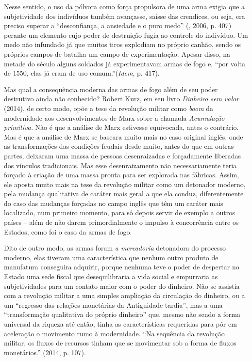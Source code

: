 Nesse sentido, o uso da pólvora como força propulsora de uma arma exigia
que a subjetividade dos indivíduos também avançasse, saísse das
crendices, ou seja, era preciso superar a ``desconfiança, a ansiedade e
o puro medo'' (, 2006, p. 407) perante um elemento cujo poder de
destruição fugia ao controle do indivíduo. Um medo não infundado já que
muitos tiros explodiam no próprio canhão, sendo os próprios campos de
batalha um campo de experimentação. Apesar disso, na metade do século 
alguns soldados já experimentavam armas de fogo e, ``por volta de 1550,
elas já eram de uso comum.''(\emph{Idem}, p. 417).

Mas qual a consequência moderna das armas de fogo além de seu poder
destrutivo ainda não conhecido? Robert Kurz, em seu livro \emph{Dinheiro
sem valor} (2014), de certo modo, opõe a tese da revolução
militar como \emph{boom} da modernidade aos desenvolvimentos de Marx
sobre a chamada \emph{Acumulação primitiva.} Não é que a análise de Marx
estivesse equivocada, antes o contrário. Mas é que a análise de Marx se
baseara muito mais no caso original inglês, onde as transformações das
condições feudais desde muito, antes do que em outras partes, deixaram
uma massa de pessoas desenraizadas e forçadamente liberadas dos vínculos
tradicionais. Mas esse desenraizamento não necessariamente
teria forçado à criação de uma massa pronta para ser explorada nas
fábricas. Assim, ele aposta muito mais na tese da revolução militar como
um detonador moderno, pela mudança qualitativa de caráter mais geral a
que ela conduz, diferentemente do caso das mudanças forçadas no campo
inglês que têm um caráter mais localizado, num primeiro momento, para só
depois servir de exemplo a outros países -- além de não darem
primordialmente o impulso à concorrência entre os Estados, como foi o
caso da armas de fogo.

Dito de outro modo, as armas foram \emph{a mercadoria} detonadora do
processo moderno, elas tiveram uma característica que nenhum outro
produto de manufatura conseguira adquirir, porque nenhuma teve o poder
de despertar no Estado uma sede fiscal que desequilibraria a vida social
e empurraria as subjetividades para um contato maior com o poder do
dinheiro. Não se assistia com a revolução militar a uma
simples ampliação da circulação do dinheiro, ou a um ``regresso das
relações monetárias da Antiguidade tardia'', mas a uma ``transformação
qualitativa do próprio dinheiro'' que, mesmo não sendo a forma universal
da riqueza até então, tinha as características requeridas para pôr em
aceleração o movimento rumo à modernidade. ``Na sequência da revolução
militar, os fluxos de recursos tinham que se movimentar sob a forma de
fluxos monetários.'' (2014, p. 107).

